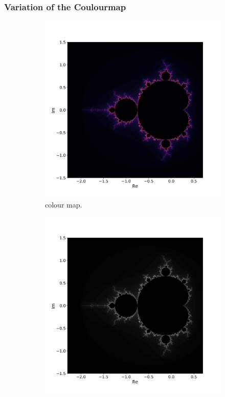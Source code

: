 \documentclass[
  12pt,					%
  a4paper,				%
  twoside,				%
]{report}
\begin{document}
\newpage
\subsubsection{Variation of the Coulourmap}

\begin{figure}[H]
\centering
\begin{subfigure}{.45\textwidth}
  \centering
  \includegraphics[width=\linewidth]{IMG/ColourInferno.png}
  \caption{{} colour map.}
\end{subfigure}%
\begin{subfigure}{.45\textwidth}
  \centering
  \includegraphics[width=\linewidth]{IMG/ColourGistGray.png}

\end{subfigure}
\end{figure}
\end{document}
